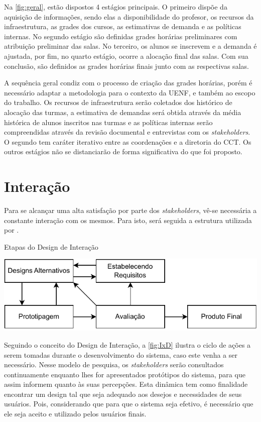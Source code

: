 Na \autoref{fig:geral}, estão dispostos 4 estágios principais. O primeiro dispõe da aquisição de informações, sendo elas a disponibilidade do profesor, os recursos da infraestrutura, as grades dos cursos, as estimativas de demanda e as políticas internas. No segundo estágio são definidas grades horárias preliminares com atribuição preliminar das salas. No terceiro, os alunos se inscrevem e a demanda é ajustada, por fim, no quarto estágio, ocorre a alocação final das salas. Com sua conclusão, são definidos as grades horárias finais junto com as respectivas salas.

A sequência geral condiz com o processo de criação das grades horárias, porém é necessário adaptar a metodologia para o contexto da UENF, e também ao escopo do trabalho. Os recursos de infraestrutura serão coletados dos histórico de alocação das turmas, a estimativa de demandas será obtida através da média histórica de alunos inscritos nas turmas e as políticas internas serão compreendidas através da revisão documental e entrevistas com os \textit{stakeholders}. O segundo tem caráter iterativo entre as coordenações e a diretoria do CCT. Os outros estágios não se distanciarão de forma significativa do que foi proposto.

\section{Interação} \label{sec:interacao} %

Para se alcançar uma alta satisfação por parte dos \textit{stakeholders}, vê-se necessária a constante interação com os mesmos. Para isto, será seguida a estrutura utilizada por .

\begin{CenteredFigure} \caption{Etapas do Design de Interação} \label{fig:IxD}
  \includegraphics{files/img/2.02!4-modelagem/Arquitetura-IxD}
\end{CenteredFigure}

Seguindo o conceito do Design de Interação, a \autoref{fig:IxD} ilustra o ciclo de ações a serem tomadas durante o desenvolvimento do sistema, caso este venha a ser necessário. Nesse modelo de pesquisa, os \textit{stakeholders} serão consultados continuamente enquanto lhes for apresentados protótipos do sistema, para que assim informem quanto às suas percepções. Esta dinâmica tem como finalidade encontrar um design tal que seja adequado aos desejos e necessidades de seus usuários. Pois, considerando que para que o sistema seja efetivo, é necessário que ele seja aceito e utilizado pelos usuários finais.

